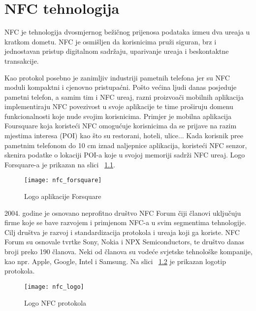 \chapter{NFC tehnologija}
NFC je tehnologija dvosmjernog be\v{z}i\v{c}nog prijenosa podataka izme\dj u dva ure\dj aja u kratkom dometu. NFC je osmi\v{s}ljen da korisnicima pru\v{z}i siguran, brz i jednostavan pristup digitalnom sadr\v{z}aju, uparivanje ure\dj aja i beskontaktne transakcije.

Kao protokol posebno je zanimljiv industriji pametnih telefona jer su NFC moduli kompaktni i cjenovno pristupa\'{c}ni. Po\v{s}to ve\'{c}ina ljudi danas posjeduje pametni telefon, a samim tim i NFC ure\dj aj, razni proizvo\dj a\v{c}i mobilnih aplikacija implementiraju NFC povezivost u svoje aplikacije te time pro\v{s}iruju domenu funkcionalnosti koje nude svojim korisnicima. Primjer je mobilna aplikacija Foursquare \cite{foursquare} koja koriste\'{c}i NFC omogu\'{c}uje korisnicima da se prijave na razim mjestima interesa (POI) kao \v{s}to su restorani, hoteli, ulice... Kada korisnik pre\dj e pametnim telefonom do 10 cm iznad naljepnice aplikacija, koriste\'{c}i NFC senzor, skenira podatke o lokaciji POI-a koje u svojoj memoriji sadr\v{z}i NFC ure\dj aj. Logo Forsquare-a je prikazan na slici  ~\ref{fig:forsquare}.

\begin{figure}[!htbp]
	\begin{center}
 \texttt{[image: nfc\_forsquare]}
 \caption{Logo aplikacije Forsquare \cite{foursquare}}
 \label{fig:forsquare}
	\end{center}
\end{figure}

2004. godine je osnovano neprofitno dru\v{s}tvo NFC Forum \cite{nfc_forum} \v{c}iji \v{c}lanovi uklju\v{c}uju firme koje se bave razvojem i primjenom NFC-a u svim segmentima tehnologije. Cilj dru\v{s}tva je razvoj i standardizacija protokola i ure\dj aja koji ga koriste. NFC Forum su osnovale tvrtke Sony, Nokia i NPX Semiconductors, te dru\v{s}tvo danas broji preko 190 \v{c}lanova. Neki od \v{c}lanova su vode\'{c}e svjetske tehnolo\v{s}ke kompanije, kao npr. Apple, Google, Intel i Samsung. Na slici  ~\ref{fig:nfc} je prikazan logotip protokola.

\begin{figure}[!htbp]
	\begin{center}
 \texttt{[image: nfc\_logo]}
 \caption{Logo NFC protokola \cite{nfc_forum}}
 \label{fig:nfc}
	\end{center}
\end{figure}

